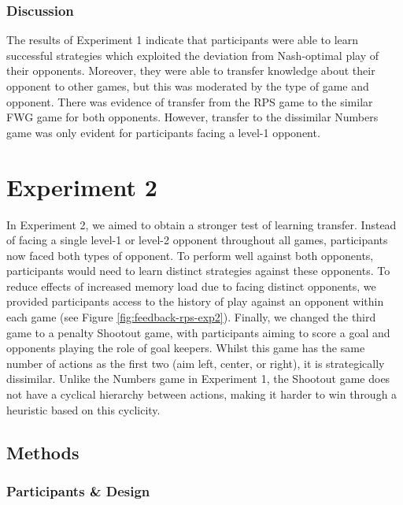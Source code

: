 \documentclass[
  english,
  man,floatsintext]{apa6}
\begin{document}
\hypertarget{discussion}{%
\subsubsection{Discussion}\label{discussion}}

The results of Experiment 1 indicate that participants were able to learn successful strategies which exploited the deviation from Nash-optimal play of their opponents. Moreover, they were able to transfer knowledge about their opponent to other games, but this was moderated by the type of game and opponent. There was evidence of transfer from the RPS game to the similar FWG game for both opponents. However, transfer to the dissimilar Numbers game was only evident for participants facing a level-1 opponent.

\hypertarget{experiment-2}{%
\section{Experiment 2}\label{experiment-2}}

In Experiment 2, we aimed to obtain a stronger test of learning transfer. Instead of facing a single level-1 or level-2 opponent throughout all games, participants now faced both types of opponent. To perform well against both opponents, participants would need to learn distinct strategies against these opponents. To reduce effects of increased memory load due to facing distinct opponents, we provided participants access to the history of play against an opponent within each game (see Figure \ref{fig:feedback-rps-exp2}). Finally, we changed the third game to a penalty Shootout game, with participants aiming to score a goal and opponents playing the role of goal keepers. Whilst this game has the same number of actions as the first two (aim left, center, or right), it is strategically dissimilar. Unlike the Numbers game in Experiment 1, the Shootout game does not have a cyclical hierarchy between actions, making it harder to win through a heuristic based on this cyclicity.

\hypertarget{methods-1}{%
\subsection{Methods}\label{methods-1}}

\hypertarget{participants-design}{%
\subsubsection{Participants \& Design}\label{participants-design}}
\end{document}
